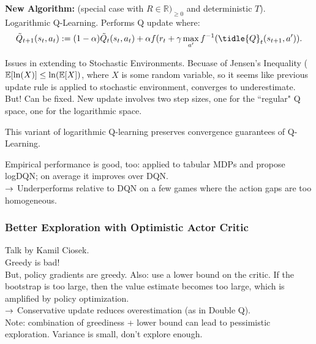 {\bf New Algorithm:} (special case with $R \in \mathbb{R})_{\geq 0}$ and deterministic $T$). Logarithmic Q-Learning. Performs Q update where:
    \begin{equation}
        \tilde{Q}_{t+1}(s_t,a_t) := (1-\alpha)\tilde{Q}_t(s_t,a_t) + \alpha f(r_t + \gamma \max_{a'} f^{-1}(\tidle{Q}_t(s_{t+1}, a')).
    \end{equation}
    
Issues in extending to Stochastic Environments. Becuase of Jensen's Inequality ($\mathbb{E}[\ln(X)] \leq \ln(\mathbb{E}[X])$, where $X$ is some random variable, so it seems like previous update rule is applied to stochastic environment, converges to underestimate. \\

But! Can be fixed. New update involves two step sizes, one for the ``regular" Q space, one for the logarithmic space. 

\begin{theorem}
This variant of logarithmic Q-learning preserves convergence guarantees of Q-Learning.
\end{theorem}

Empirical performance is good, too: applied to tabular MDPs and propose logDQN; on average it improves over DQN. \\

$\rightarrow$ Underperforms relative to DQN on a few games where the action gaps are too homogeneous.


\subsubsection{Better Exploration with Optimistic Actor Critic \cite{ciosek2019better}}

Talk by Kamil Ciosek. \\

Greedy is bad! \\

But, policy gradients are greedy. Also: use a lower bound on the critic. If the bootstrap is too large, then the value estimate becomes too large, which is amplified by policy optimization. \\

$\rightarrow$ Conservative update reduces overestimation (as in Double Q). \\

Note: combination of greediness + lower bound can lead to pessimistic exploration. Variance is small, don't explore enough. \\

